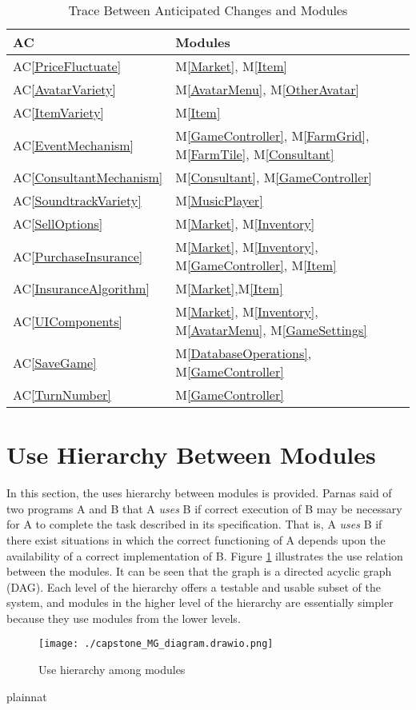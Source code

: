 \documentclass[12pt, titlepage]{article}
\newcommand{\acref}[1]{AC\ref{#1}}
\newcommand{\mref}[1]{M\ref{#1}}
\begin{document}
\begin{table}[H]
\centering
\begin{tabular}{p{} p{}}
\toprule
\textbf{AC} & \textbf{Modules}\\
\midrule
\acref{PriceFluctuate} & \mref{Market}, \mref{Item}\\
\acref{AvatarVariety} & \mref{AvatarMenu}, \mref{OtherAvatar}\\
\acref{ItemVariety} & \mref{Item}\\
\acref{EventMechanism} & \mref{GameController}, \mref{FarmGrid}, \mref{FarmTile}, \mref{Consultant}\\
\acref{ConsultantMechanism} & \mref{Consultant}, \mref{GameController}\\
\acref{SoundtrackVariety} & \mref{MusicPlayer}\\
\acref{SellOptions} & \mref{Market}, \mref{Inventory}\\
\acref{PurchaseInsurance} & \mref{Market}, \mref{Inventory}, \mref{GameController}, \mref{Item}\\
\acref{InsuranceAlgorithm} & \mref{Market},\mref{Item}\\
\acref{UIComponents} & \mref{Market}, \mref{Inventory}, \mref{AvatarMenu}, \mref{GameSettings}\\
\acref{SaveGame} & \mref{DatabaseOperations}, \mref{GameController}\\
\acref{TurnNumber} & \mref{GameController}\\
\bottomrule
\end{tabular}
\caption{Trace Between Anticipated Changes and Modules}
\label{TblACT}
\end{table}

\section{Use Hierarchy Between Modules} \label{SecUse}

In this section, the uses hierarchy between modules is
provided. Parnas said of two programs A and B that A {\em uses} B if
correct execution of B may be necessary for A to complete the task described in
its specification. That is, A {\em uses} B if there exist situations in which
the correct functioning of A depends upon the availability of a correct
implementation of B.  Figure \ref{FigUH} illustrates the use relation between
the modules. It can be seen that the graph is a directed acyclic graph
(DAG). Each level of the hierarchy offers a testable and usable subset of the
system, and modules in the higher level of the hierarchy are essentially simpler
because they use modules from the lower levels.

\begin{figure}[H]
\centering
\texttt{[image: ./capstone\_MG\_diagram.drawio.png]}
\caption{Use hierarchy among modules}
\label{FigUH}
\end{figure}


 {plainnat}


\newpage{}
\end{document}
